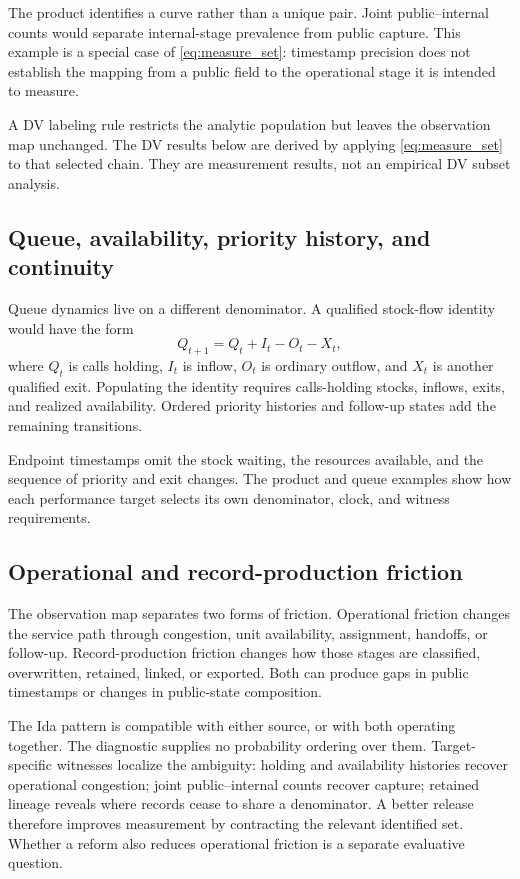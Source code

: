\documentclass[11pt]{article}
\begin{document}
The product identifies a curve rather than a unique pair. Joint public--internal counts would separate internal-stage prevalence from public capture. This example is a special case of \cref{eq:measure_set}: timestamp precision does not establish the mapping from a public field to the operational stage it is intended to measure.

A DV labeling rule restricts the analytic population but leaves the observation map unchanged. The DV results below are derived by applying \cref{eq:measure_set} to that selected chain. They are measurement results, not an empirical DV subset analysis.

\subsection{Queue, availability, priority history, and continuity}

Queue dynamics live on a different denominator. A qualified stock-flow identity would have the form
\begin{equation}
Q_{t+1}=Q_t+I_t-O_t-X_t,
\label{eq:queue}
\end{equation}
where $Q_t$ is calls holding, $I_t$ is inflow, $O_t$ is ordinary outflow, and $X_t$ is another qualified exit. Populating the identity requires calls-holding stocks, inflows, exits, and realized availability. Ordered priority histories and follow-up states add the remaining transitions.

Endpoint timestamps omit the stock waiting, the resources available, and the sequence of priority and exit changes. The product and queue examples show how each performance target selects its own denominator, clock, and witness requirements.

\subsection{Operational and record-production friction}

The observation map separates two forms of friction. Operational friction changes the service path through congestion, unit availability, assignment, handoffs, or follow-up. Record-production friction changes how those stages are classified, overwritten, retained, linked, or exported. Both can produce gaps in public timestamps or changes in public-state composition.

The Ida pattern is compatible with either source, or with both operating together. The diagnostic supplies no probability ordering over them. Target-specific witnesses localize the ambiguity: holding and availability histories recover operational congestion; joint public--internal counts recover capture; retained lineage reveals where records cease to share a denominator. A better release therefore improves measurement by contracting the relevant identified set. Whether a reform also reduces operational friction is a separate evaluative question.
\end{document}

